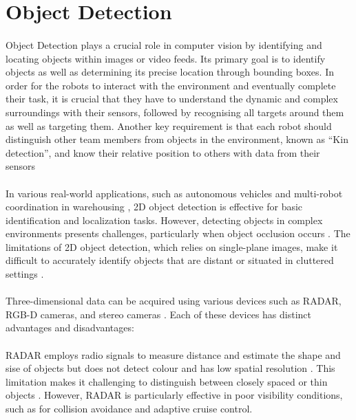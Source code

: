 \section{Object Detection}

\paragraph*{}
Object Detection plays a crucial role in computer vision by identifying and locating objects within images or video feeds. Its primary goal is to identify objects as well as determining its precise location through bounding boxes. In order for the robots to interact with the environment and eventually complete their task, it is crucial that they have to understand the dynamic and complex surroundings with their sensors, followed by recognising all targets around them as well as targeting them. Another key requirement is that each robot should distinguish other team members from objects in the environment, known as “Kin detection”, and know their relative position to others with data from their sensors

\paragraph*{}
In various real-world applications, such as autonomous vehicles \cite{redmon2016yolo} and multi-robot coordination in warehousing \cite{kumar2018multi}, 2D object detection is effective for basic identification and localization tasks. However, detecting objects in complex environments presents challenges, particularly when object occlusion occurs \cite{girshick2014rich}. The limitations of 2D object detection, which relies on single-plane images, make it difficult to accurately identify objects that are distant or situated in cluttered settings \cite{chen2023object}.

\paragraph*{}
Three-dimensional data can be acquired using various devices such as RADAR, RGB-D cameras, and stereo cameras \cite{karin2023comparative}. Each of these devices has distinct advantages and disadvantages:

\paragraph*{}
RADAR employs radio signals to measure distance and estimate the shape and sise of objects but does not detect colour and has low spatial resolution \cite{karin2023comparative}. This limitation makes it challenging to distinguish between closely spaced or thin objects \cite{wang2020radar}. However, RADAR is particularly effective in poor visibility conditions, such as for collision avoidance and adaptive cruise control.


